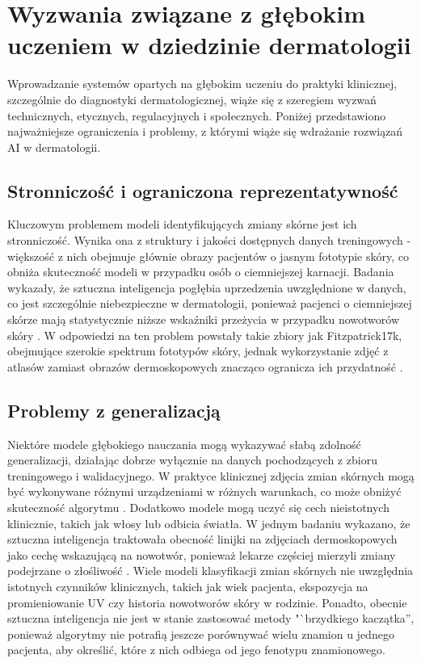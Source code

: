 \section{Wyzwania związane z głębokim uczeniem w dziedzinie dermatologii}
Wprowadzanie systemów opartych na głębokim uczeniu do praktyki klinicznej, szczególnie do diagnostyki dermatologicznej, wiąże się z szeregiem wyzwań technicznych, etycznych, regulacyjnych i społecznych.
Poniżej przedstawiono najważniejsze ograniczenia i problemy, z którymi wiąże się wdrażanie rozwiązań AI w dermatologii.

\subsection{Stronniczość i ograniczona reprezentatywność}
Kluczowym problemem modeli identyfikujących zmiany skórne jest ich stronniczość.
Wynika ona z struktury i jakości dostępnych danych treningowych - większość z nich obejmuje głównie obrazy pacjentów o jasnym fototypie skóry, co obniża skuteczność modeli w przypadku osób o ciemniejszej karnacji.
Badania wykazały, że sztuczna inteligencja pogłębia uprzedzenia uwzględnione w danych, co jest szczególnie niebezpieczne w dermatologii, ponieważ pacjenci o ciemniejszej skórze mają statystycznie niższe wskaźniki przeżycia w przypadku nowotworów skóry \cite{Aldaham_2016}.
W odpowiedzi na ten problem powstały takie zbiory jak Fitzpatrick17k, obejmujące szerokie spektrum fototypów skóry, jednak wykorzystanie zdjęć z atlasów zamiast obrazów dermoskopowych znacząco ogranicza ich przydatność \cite{groh2021evaluating}.

\subsection{Problemy z generalizacją}
Niektóre modele głębokiego nauczania mogą wykazywać słabą zdolność generalizacji, działając dobrze wyłącznie na danych pochodzących z zbioru treningowego i walidacyjnego. 
W praktyce klinicznej zdjęcia zmian skórnych mogą być wykonywane różnymi urządzeniami w różnych warunkach, co może obniżyć skuteczność algorytmu \cite{Kelly_Karthikesalingam_Suleyman_Corrado_King_2019}.
Dodatkowo modele mogą uczyć się cech nieistotnych klinicznie, takich jak włosy lub odbicia światła.
W jednym badaniu wykazano, że sztuczna inteligencja traktowała obecność linijki na zdjęciach dermoskopowych jako cechę wskazującą na nowotwór, ponieważ lekarze częściej mierzyli zmiany podejrzane o złośliwość \cite{Esteva_Kuprel_Novoa_Ko_Swetter_Blau_Thrun_2017}.
Wiele modeli klasyfikacji zmian skórnych nie uwzględnia istotnych czynników klinicznych, takich jak wiek pacjenta, ekspozycja na promieniowanie UV czy historia nowotworów skóry w rodzinie.
Ponadto, obecnie sztuczna inteligencja nie jest w stanie zastosować metody "`brzydkiego kaczątka'', ponieważ algorytmy nie potrafią jeszcze porównywać wielu znamion u jednego pacjenta, aby określić, które z nich odbiega od jego fenotypu znamionowego.

